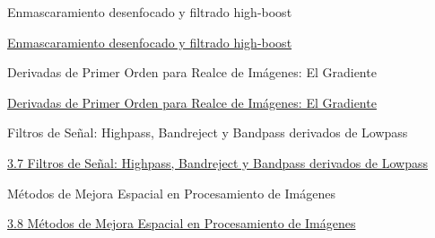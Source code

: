 \documentclass{beamer}
\begin{document}
\begin{frame}[fragile]{Enmascaramiento desenfocado y filtrado high-boost}

\href{Tema_3_6_pag_182.html}{Enmascaramiento desenfocado y filtrado high-boost}

\end{frame}

\begin{frame}[fragile]{Derivadas de Primer Orden para Realce de Imágenes: El Gradiente}

\href{Tema_3_6_pag_184.html}{Derivadas de Primer Orden para Realce de Imágenes: El Gradiente}

\end{frame}

\begin{frame}[fragile]{Filtros de Señal: Highpass, Bandreject y Bandpass derivados de Lowpass}

\href{Tema_3_7_pag_188.html}{3.7 Filtros de Señal: Highpass, Bandreject y Bandpass derivados de Lowpass}

\end{frame}

\begin{frame}[fragile]{Métodos de Mejora Espacial en Procesamiento de Imágenes}

\href{Tema_3_8_pag_191.html}{3.8 Métodos de Mejora Espacial en Procesamiento de Imágenes}

\end{frame}
\end{document}
